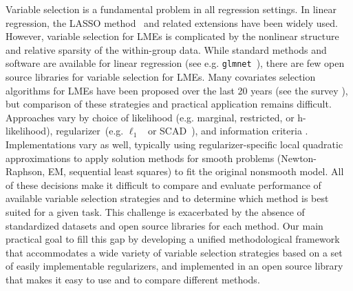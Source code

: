Variable selection is a fundamental problem in all regression settings. In linear regression, the LASSO method~\citep{tibshirani1996regression} and related extensions have been widely used. %
However, variable selection for LMEs is complicated by the nonlinear structure and relative sparsity of the within-group data. 
While standard methods and software are available for linear regression (see e.g. \texttt{glmnet}~\cite{glmnet}), there are few open source libraries for variable selection 
for LMEs. 
Many covariates selection algorithms for LMEs have been proposed over the last 20 years (see the survey \cite{Buscemi2019Survey}), but comparison of 
these strategies and practical application remains difficult. %
Approaches vary by choice of likelihood (e.g. marginal, restricted, or h- likelihood),  
regularizer~(e.g. $\ell_1$~\citep{Krishna2008} or SCAD~\cite{ibrahim2011fixed}), and information criteria \citep{Vaida2005,Ibrahim2011}. 
Implementations vary as well, typically using regularizer-specific local quadratic approximations to apply
solution methods for smooth problems (Newton-Raphson, EM, sequential least squares) to fit the original nonsmooth model. 
All of these decisions make it  difficult to compare and evaluate performance of available 
variable selection strategies and to determine which method is best suited for a given task. 
This challenge  is exacerbated by the absence of standardized datasets %
and open source libraries for each method. 
Our main practical goal to fill this gap by developing a unified methodological framework that
accommodates a wide variety of variable selection strategies based on a set
of easily implementable regularizers, and implemented in an open source library that makes 
it easy to use and to compare different methods. 

